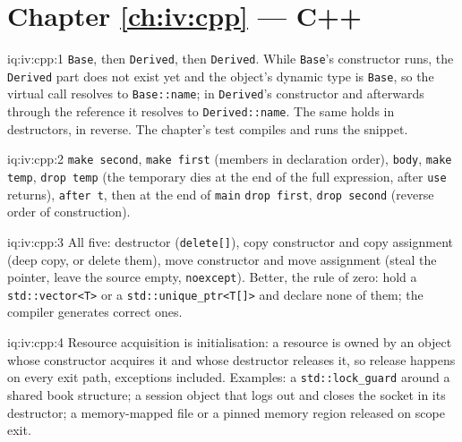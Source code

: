\section*{Chapter \ref{ch:iv:cpp} --- C++}

\begin{solution}{iq:iv:cpp:1}
\texttt{Base}, then \texttt{Derived}, then \texttt{Derived}. While \texttt{Base}'s constructor runs, the \texttt{Derived} part does not
exist yet and the object's dynamic type is \texttt{Base}, so the virtual call resolves to \texttt{Base::name}; in
\texttt{Derived}'s constructor and afterwards through the reference it resolves to \texttt{Derived::name}. The same holds in
destructors, in reverse. The chapter's test compiles and runs the snippet.
\end{solution}

\begin{solution}{iq:iv:cpp:2}
\texttt{make second}, \texttt{make first} (members in declaration order), \texttt{body}, \texttt{make temp}, \texttt{drop temp}
(the temporary dies at the end of the full expression, after \texttt{use} returns), \texttt{after t}, then at the end of
\texttt{main} \texttt{drop first}, \texttt{drop second} (reverse order of construction).
\end{solution}

\begin{solution}{iq:iv:cpp:3}
All five: destructor (\texttt{delete[]}), copy constructor and copy assignment (deep copy, or delete them), move constructor and move
assignment (steal the pointer, leave the source empty, \texttt{noexcept}). Better, the rule of zero: hold a
\texttt{std::vector<T>} or a \texttt{std::unique\_ptr<T[]>} and declare none of them; the compiler generates correct ones.
\end{solution}

\begin{solution}{iq:iv:cpp:4}
Resource acquisition is initialisation: a resource is owned by an object whose constructor acquires it and whose destructor
releases it, so release happens on every exit path, exceptions included. Examples: a \texttt{std::lock\_guard} around a shared
book structure; a session object that logs out and closes the socket in its destructor; a memory-mapped file or a pinned memory
region released on scope exit.
\end{solution}

